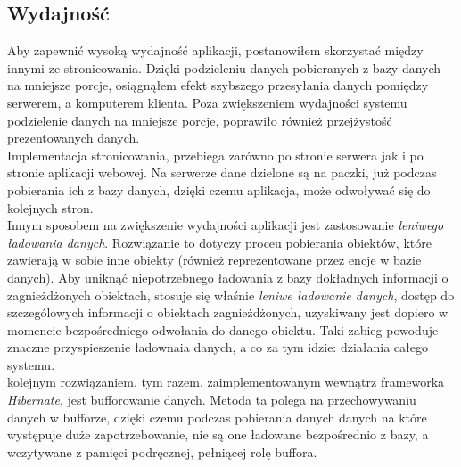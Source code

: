 \documentclass[a4paper, titlepage]{article}
\begin{document}
\begin{itemize}
\subsection {Wydajność}
            Aby zapewnić wysoką wydajność aplikacji, postanowiłem skorzystać między innymi ze stronicowania. Dzięki podzieleniu danych pobieranych z bazy danych na mniejsze porcje, osiągnąłem efekt szybszego przesyłania danych pomiędzy serwerem, a komputerem klienta. Poza zwiększeniem wydajności systemu podzielenie danych na mniejsze porcje, poprawiło również przejżystość prezentowanych danych.
            \\Implementacja stronicowania, przebiega zarówno po stronie serwera jak i po stronie aplikacji webowej. Na serwerze dane dzielone są na paczki, już podczas pobierania ich z bazy danych, dzięki czemu aplikacja, może odwoływać się do kolejnych stron.
            \\Innym sposobem na zwiększenie wydajności aplikacji jest zastosowanie \textit{leniwego ładowania danych}. Rozwiązanie to dotyczy proceu pobierania obiektów, które zawierają w sobie inne obiekty (również reprezentowane przez encje w bazie danych). Aby uniknąć niepotrzebnego ładowania z bazy dokładnych informacji o zagnieżdżonych obiektach, stosuje się właśnie \textit{leniwe ładowanie danych}, dostęp do szczególowych informacji o obiektach zagnieżdżonych, uzyskiwany jest dopiero w momencie bezpośredniego odwołania do danego obiektu. Taki zabieg powoduje znaczne przyspieszenie ładownaia danych, a co za tym idzie: działania całego systemu.
            \\kolejnym rozwiązaniem, tym razem, zaimplementowanym wewnątrz frameworka \textit{Hibernate}, jest bufforowanie danych. Metoda ta polega na przechowywaniu danych w bufforze, dzięki czemu podczas pobierania danych danych na które występuje duże zapotrzebowanie, nie są one ładowane bezpośrednio z bazy, a wczytywane z pamięci podręcznej, pełniącej rolę buffora.
            

\end{itemize}
\end{document}
